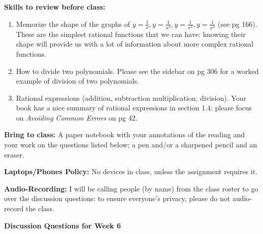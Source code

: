 \documentclass[12pt,dvipsnames]{article}
\begin{document}
	{\bfseries{Skills to review before class:} }
\begin{multicols}{2}
	\begin{enumerate}[topsep=0pt,itemsep=-2ex,partopsep=0ex,parsep=1ex]
		
                   \item Memorize the shape of the graphs of $\displaystyle y=\frac{1}{x}, y=\frac{1}{x^2}, y=\frac{1}{x^2}, y=\frac{1}{x^4}$ (see pg 166). These are the simplest rational functions that we can have: knowing their shape will provide us with a lot of information about more complex rational functions.
\item How to divide two polynomials. Please see the sidebar on pg 306 for a worked example of division of two polynomials.
\item Rational expressions (addition, subtraction multiplication, division). Your book has a nice summary of rational expressions in section 1.4: please focus on \emph{Avoiding Common Errors} on pg 42.
		
	\end{enumerate}
		
\end{multicols}
{\bfseries{Bring to class:} } A paper notebook with your annotations of the reading and your work on the questions listed below; a pen and/or a sharpened pencil and an eraser.

{\bfseries{Laptops/Phones Policy:}}  No devices in class, unless the assignment requires it.

{\bfseries{Audio-Recording:}} I will be calling people (by name) from the class roster to go over the discussion questions: to ensure everyone's privacy, please do not audio-record the class.


\begin{center}

{\large{\bfseries{Discussion Questions for Week 6} }}
\end{center}
\end{document}
